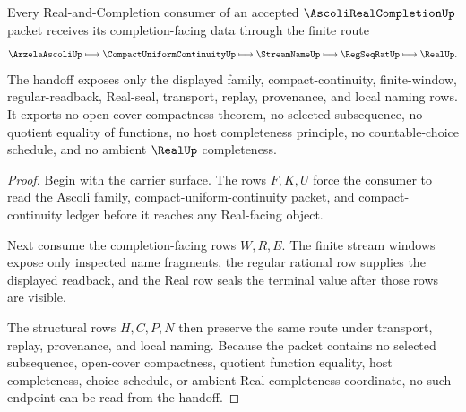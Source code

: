 \begin{theorem}
\label{thm:ascoli-real-completion-modulus-handoff}
Every Real-and-Completion consumer of an accepted $\AscoliRealCompletionUp$ packet receives its completion-facing data through the finite route
$$
\ArzelaAscoliUp
\longmapsto
\CompactUniformContinuityUp
\longmapsto
\StreamNameUp
\longmapsto
\RegSeqRatUp
\longmapsto
\RealUp .
$$
The handoff exposes only the displayed family, compact-continuity, finite-window, regular-readback, Real-seal, transport, replay, provenance, and local naming rows. It exports no open-cover compactness theorem, no selected subsequence, no quotient equality of functions, no host completeness principle, no countable-choice schedule, and no ambient $\RealUp$ completeness.
\end{theorem}
\begin{proof}
Begin with the carrier surface. The rows $F,K,U$ force the consumer to read the Ascoli family, compact-uniform-continuity packet, and compact-continuity ledger before it reaches any Real-facing object.

Next consume the completion-facing rows $W,R,E$. The finite stream windows expose only inspected name fragments, the regular rational row supplies the displayed readback, and the Real row seals the terminal value after those rows are visible.

The structural rows $H,C,P,N$ then preserve the same route under transport, replay, provenance, and local naming. Because the packet contains no selected subsequence, open-cover compactness, quotient function equality, host completeness, choice schedule, or ambient Real-completeness coordinate, no such endpoint can be read from the handoff.
\end{proof}


\begin{closurestatus}{\AscoliRealCompletionUp}
  \theoryclosure{\seedClosure}
  \formalstatus{\unformalizedV}
\end{closurestatus}
